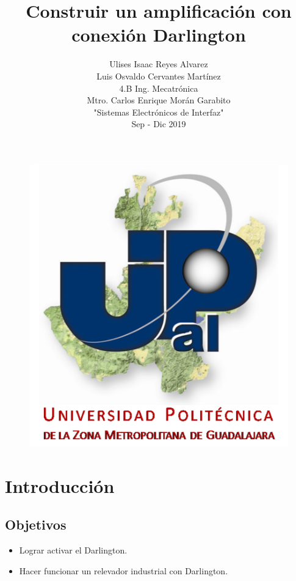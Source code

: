 \documentclass[10pt,a4paper]{article}
\author{Ulises Isaac Reyes Alvarez\\Luis Osvaldo Cervantes Mart\'inez\\4.B Ing. Mecatrónica\\Mtro. Carlos Enrique Morán Garabito\\"Sistemas Electrónicos de Interfaz"\\ Sep - Dic 2019}
\title{Construir un amplificación con conexión Darlington}
\begin{document}
\maketitle
\begin{figure}[hbtp]
\centering
\includegraphics[scale=2]{Pictures/UPZMG.png}
\end{figure}

\newpage
\section{Introducción}
\subsection*{Objetivos}
\begin{itemize}
\item Lograr activar el Darlington.
\item Hacer funcionar un relevador industrial con Darlington. 
\end{itemize}
\end{document}
